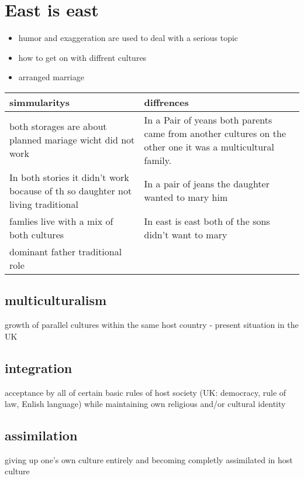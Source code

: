 \documentclass{article}
\begin{document}
\section*{East is east}

\begin{itemize}

\item humor and exaggeration are used to deal with a serious topic
\item how to get on with diffrent cultures
\item arranged marriage

\end{itemize}

\renewcommand{\arraystretch}{2}
\begin{tabular}[h]{p{6cm}|p{6cm}}
simmularitys & diffrences \\
\hline
both storages are about planned mariage wicht did not work & In a Pair of yeans both parents came from another cultures on the other one it was a multicultural family.\\
In both stories it didn't work bocause of th so daughter not living traditional&In a pair of jeans the daughter wanted to mary him \\
famlies live with a mix of both cultures & In east is east both of the sons didn't want to mary \\
dominant father traditional role &  \\
\end{tabular}

\subsection*{multiculturalism}
growth of parallel cultures within the same host country - present situation in the UK

\subsection*{integration}
acceptance by all of certain basic rules of host society (UK: democracy, rule of law, Enlish language) while maintaining own religious and/or cultural identity

\subsection*{assimilation}
giving up one's own culture entirely and becoming completly assimilated in host culture
\end{document}
